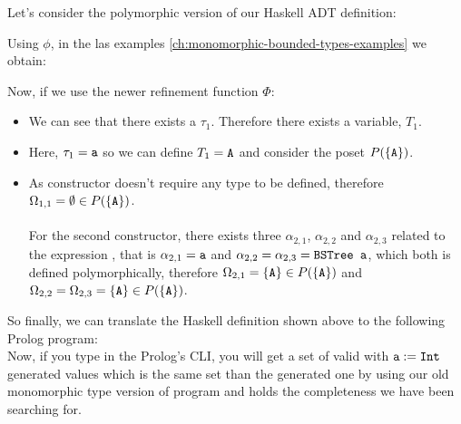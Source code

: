 	\begin{example}
		Let's consider the polymorphic version of our  Haskell ADT definition:
		
		Using $\phi$, in the las examples \ref{ch:monomorphic-bounded-types-examples} we obtain:
		
		Now, if we use the newer refinement function $\Phi$:
		\begin{itemize}
			\item We can see that there exists a $\tau_1$. Therefore there exists a variable, $T_1$.
			\item Here, $\tau_1 = \texttt{a}$ so we can define $T_1 = \texttt{A}$ and consider the poset $P(\{\texttt{A}\})$.
			\item As  constructor doesn't require any type to be defined, therefore $\Omega_{1,1} = \emptyset \in P(\{ \texttt{A} \})$. \\\\
			      For the second constructor, there exists three $\alpha_{2,1}$, $\alpha_{2,2}$ and $\alpha_{2,3}$ related to the expression , that is $\alpha_{2,1} = \texttt{a}$ and $\alpha_{2,2} = \alpha_{2,3} = \texttt{BSTree a}$, which both is defined polymorphically, therefore $\Omega_{2,1} = \{\texttt{A}\} \in P(\{ \texttt{A} \})$ and $\Omega_{2,2} = \Omega_{2,3} = \{\texttt{A}\} \in P(\{ \texttt{A} \})$.
		\end{itemize}
		So finally, we can translate the Haskell definition shown above to the following Prolog program:\\
		
		Now, if you type  in the Prolog's CLI, you will get a set of valid  with $\texttt{a} := \texttt{Int}$ generated values which is the same set than the generated one by using our old monomorphic type version of  program and holds the completeness we have been searching for.\\
	\end{example}

